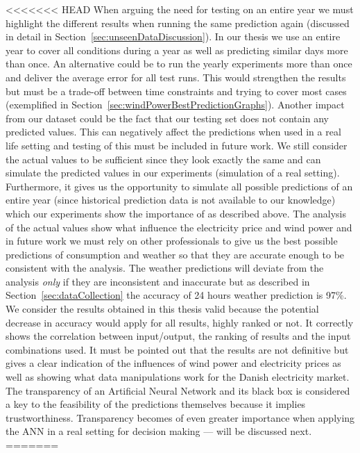 <<<<<<< HEAD
When arguing the need for testing on an entire year we must highlight the different results when running the same prediction again (discussed in detail in Section~\ref{sec:unseenDataDiscussion}). In our thesis we use an entire year to cover all conditions during a year as well as predicting similar days more than once. An alternative could be to run the yearly experiments more than once and deliver the average error for all test runs. This would strengthen the results but must be a trade-off between time constraints and trying to cover most cases (exemplified in Section~\ref{sec:windPowerBestPredictionGraphs}). Another impact from our dataset could be the fact that our testing set does not contain any predicted values. This can negatively affect the predictions when used in a real life setting and testing of this must be included in future work. We still consider the actual values to be sufficient since they look exactly the same and can simulate the predicted values in our experiments (simulation of a real setting). Furthermore, it gives us the opportunity to simulate all possible predictions of an entire year (since historical prediction data is not available to our knowledge) which our experiments show the importance of as described above. The analysis of the actual values show what influence the electricity price and wind power and in future work we must rely on other professionals to give us the best possible predictions of consumption and weather so that they are accurate enough to be consistent with the analysis. The weather predictions will deviate from the analysis \emph{only} if they are inconsistent and inaccurate but as described in Section~\ref{sec:dataCollection} the accuracy of 24 hours weather prediction is 97\%. We consider the results obtained in this thesis valid because the potential decrease in accuracy would apply for all results, highly ranked or not. It correctly shows the correlation between input/output, the ranking of results and the input combinations used. It must be pointed out that the results are not definitive but gives a clear indication of the influences of wind power and electricity prices as well as showing what data manipulations work for the Danish electricity market. The transparency of an Artificial Neural Network and its black box is considered a key to the feasibility of the predictions themselves because it implies trustworthiness. Transparency becomes of even greater importance when applying the ANN in a real setting for decision making --- will be discussed next.
=======
